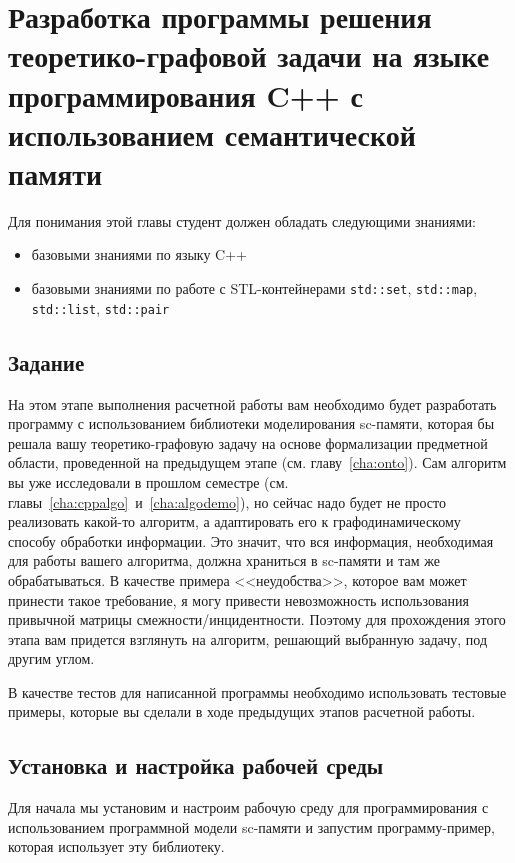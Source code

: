
\chapter{Разработка программы решения теоретико-графовой задачи на
  языке программирования C++ с использованием семантической памяти}
\label{cha:libscalgo}

Для понимания этой главы студент должен обладать следующими знаниями:

\begin{itemize}
\item базовыми знаниями по языку C++
\item базовыми знаниями по работе с STL-контейнерами
  \lstinline|std::set|, \lstinline|std::map|, \lstinline|std::list|,
  \lstinline|std::pair|
\end{itemize}

\section{Задание}
\label{sec:libscalgo_task}

На этом этапе выполнения расчетной работы вам необходимо будет
разработать программу с использованием библиотеки моделирования
sc-памяти, которая бы решала вашу теоретико-графовую задачу на основе
формализации предметной области, проведенной на предыдущем этапе
(см. главу~\ref{cha:onto}). Сам алгоритм вы уже исследовали в прошлом
семестре (см. главы~\ref{cha:cppalgo}~и~\ref{cha:algodemo}), но сейчас
надо будет не просто реализовать какой-то алгоритм, а адаптировать его
к графодинамическому способу обработки информации. Это значит, что вся
информация, необходимая для работы вашего алгоритма, должна храниться
в sc-памяти и там же обрабатываться. В качестве примера
<<неудобства>>, которое вам может принести такое требование, я могу
привести невозможность использования привычной матрицы
смежности/инцидентности.  Поэтому для прохождения этого этапа вам
придется взглянуть на алгоритм, решающий выбранную задачу, под другим
углом.

В качестве тестов для написанной программы необходимо использовать
тестовые примеры, которые вы сделали в ходе предыдущих этапов
расчетной работы.

\section{Установка и настройка рабочей среды}
\label{sec:libscalgo_setup}

Для начала мы установим и настроим рабочую среду для программирования
с использованием программной модели sc-памяти и запустим
программу-пример, которая использует эту библиотеку.

